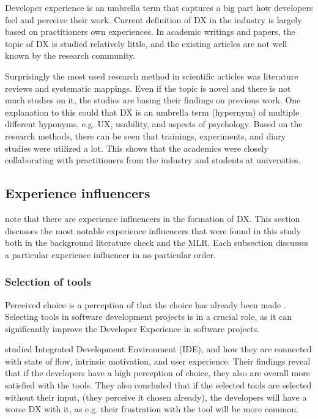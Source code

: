 \documentclass[english, 12pt, a4paper, sci, utf8, a-1b, online]{aaltothesis}
\begin{document}
Developer experience is an umbrella term that captures a big part how developers feel and perceive their work. Current definition of DX in the industry is largely based on practitioners own experiences. In academic writings and papers, the topic of DX is studied relatively little, and the existing articles are not well known by the research community.

Surprisingly the most used research method in scientific articles was literature reviews and systematic mappings. Even if the topic is novel and there is not much studies on it, the studies are basing their findings on previous work. One explanation to this could that DX is an umbrella term (hypernym) of multiple different hyponyms, e.g. UX, usability, and aspects of psychology. Based on the research methods, there can be seen that trainings, experiments, and diary studies were utilized a lot. This shows that the academics were closely collaborating with practitioners from the industry and students at universities.

\subsection{Experience influencers}

\textcite{fagerholm-doctoral-thesis} note that there are experience influencers in the formation of DX. This section discusses the most notable experience influencers that were found in this study both in the background literature check and the MLR. Each subsection discusses a particular experience influencer in no particular order. 

\subsubsection{Selection of tools}

Perceived choice is a perception of that the choice has already been made \parencite{flow-intrinsic-dx}. Selecting tools in software development projects is in a crucial role, as it can significantly improve the Developer Experience in software projects.

\textcite{flow-intrinsic-dx} studied Integrated Development Environment (IDE), and how they are connected with state of flow, intrinsic motivation, and user experience. Their findings reveal that if the developers have a high perception of choice, they also are overall more satisfied with the tools. They also concluded that if the selected tools are selected without their input, (they perceive it chosen already), the developers will have a worse DX with it, as e.g. their frustration with the tool will be more common.
\end{document}
